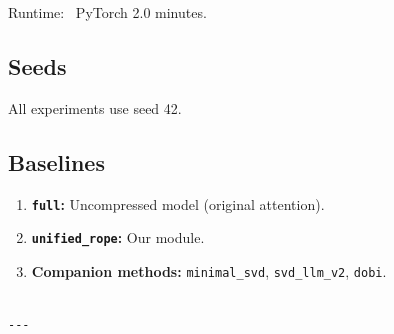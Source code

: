 Runtime: ~PyTorch 2.0 minutes.

\subsection{Seeds}

All experiments use seed 42.

\subsection{Baselines}

\begin{enumerate}
\item \textbf{\texttt{full}:} Uncompressed model (original attention).
\item \textbf{\texttt{unified\_rope}:} Our module.
\item \textbf{Companion methods:} \texttt{minimal\_svd}, \texttt{svd\_llm\_v2}, \texttt{dobi}.
\end{enumerate}
\begin{lstlisting}

---
\end{lstlisting}